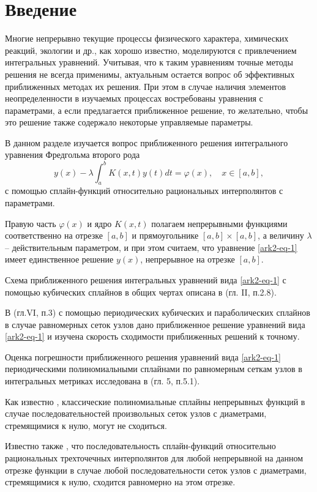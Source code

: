 \section{Введение}
Многие непрерывно текущие процессы физического характера, химических реакций,
экологии и др., как хорошо известно, моделируются с привлечением
интегральных уравнений.
Учитывая, что к таким уравнениям точные методы решения не всегда применимы,
актуальным
остается вопрос об эффективных приближенных методах их решения. При этом
в случае наличия
элементов
неопределенности в изучаемых процессах востребованы уравнения с параметрами,
а если
предлагается приближенное решение, то желательно, чтобы это решение также
содержало некоторые управляемые параметры.

В данном разделе изучается вопрос приближенного решения интегрального уравнения
Фредгольма второго рода
\begin{equation}\label{ark2-eq-1}
y(x)-\lambda \int_a^b K(x,t)y(t)dt=\varphi(x),\quad x\in[a,b],
\end{equation}
с помощью сплайн-функций относительно рациональных интерполянтов с параметрами.

Правую часть $\varphi(x)$ и ядро $K(x,t)$ полагаем непрерывными функциями соответственно
на отрезке $[a,b]$ и прямоугольнике $[a,b]\times[a,b]$, а величину $\lambda$ -- действительным
параметром, и при этом считаем, что уравнение \eqref{ark2-eq-1} имеет единственное решение $y(x)$, непрерывное
на отрезке $[a,b]$.

Схема приближенного решения интегральных уравнений вида \eqref{ark2-eq-1} с помощью кубических сплайнов
в общих чертах описана в \cite{ark-4} (гл. II, п.2.8).

В \cite{ark-7} (гл.VI, п.3) с помощью периодических кубических и параболических сплайнов
в случае равномерных сеток узлов дано приближенное решение уравнений вида \eqref{ark2-eq-1}
и изучена скорость сходимости приближенных решений к точному.

Оценка погрешности приближенного решения уравнений вида \eqref{ark2-eq-1} периодическими полиномиальными
сплайнами по равномерным сеткам узлов в интегральных метриках исследована в
\cite{ark-12} (гл. 5, п.5.1).

Как известно \cite{ark-4, ark-7}, классические полиномиальные сплайны непрерывных функций
в случае последовательностей произвольных сеток узлов с диаметрами, стремящимися к нулю,
могут не сходиться.

Известно также \cite{ark-9}, что последовательность сплайн-функций относительно рациональных
 трехточечных интерполянтов для любой непрерывной на данном отрезке функции в случае
любой последовательности сеток узлов с диаметрами, стремящимися к нулю, сходится равномерно
 на этом отрезке.

